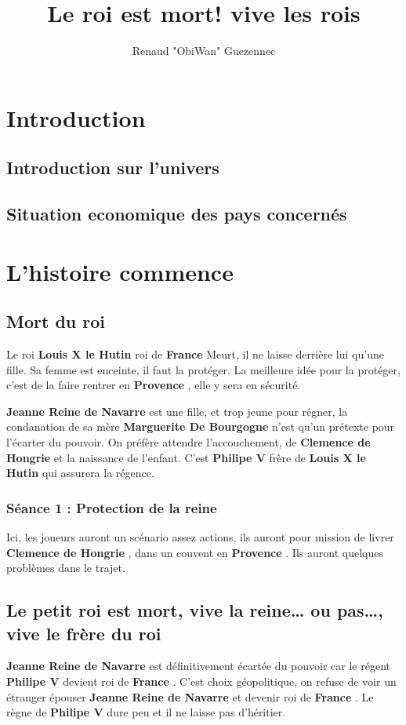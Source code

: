 \documentclass[oneside,12pt]{book}
\title{Le roi est mort! vive les rois}
\author{Renaud "ObiWan" Guezennec}
\date{}
\newcommand{\France}{\textbf{France} }
\newcommand{\Provence}{\textbf{Provence} }
\newcommand{\LouisX}{\textbf{Louis X le Hutin} }%
\newcommand{\MargueriteB}{\textbf{Marguerite De Bourgogne} }%
\newcommand{\Clemence}{\textbf{Clemence de Hongrie} }%
\newcommand{\PhilipeV}{\textbf{Philipe V} }%
\newcommand{\Jeanne}{\textbf{Jeanne Reine de Navarre} }%
\begin{document}
\maketitle \clearpage
\tableofcontents \clearpage

\begin{flushleft}
    \chapter{Introduction}
        \section{Introduction sur l'univers}

		\section{Situation economique des pays concernés}


\chapter{L'histoire commence}

\section{Mort du roi}
Le roi \LouisX roi de \France Meurt, il ne laisse derrière lui qu'une fille. Sa femme est enceinte, il faut la protéger. 
La meilleure idée pour la protéger, c'est de la faire rentrer en \Provence, elle y sera en sécurité.

\Jeanne est une fille, et trop jeune pour régner,
 la condanation de sa mère \MargueriteB n'est qu'un prétexte pour l'écarter du pouvoir. 
On préfère attendre l'accouchement, de \Clemence et la naissance de l'enfant. 
C'est \PhilipeV frère de \LouisX qui assurera la régence.



\subsection{Séance 1 : Protection de la reine}
Ici, les joueurs auront un scénario assez actions, ils auront pour mission de livrer \Clemence, dans un couvent en \Provence.
Ils auront quelques problèmes dans le trajet. 


\section{Le petit roi est mort, vive la reine… ou pas…, vive le frère du roi}
\Jeanne est définitivement écartée du pouvoir car le régent \PhilipeV devient roi de  \France.
C'est choix géopolitique, on refuse de voir un étranger épouser \Jeanne et devenir roi de \France.
Le règne de \PhilipeV dure peu et il ne laisse pas d'héritier. 


\end{flushleft}
\end{document}
